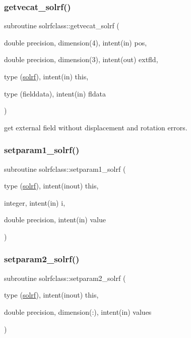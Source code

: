 \subsubsection{\texorpdfstring{getvecat\_solrf()}{getvecat\_solrf()}}
{\footnotesize\ttfamily subroutine solrfclass\+::getvecat\+\_\+solrf (\begin{DoxyParamCaption}\item[{double precision, dimension(4), intent(in)}]{pos,  }\item[{double precision, dimension(3), intent(out)}]{extfld,  }\item[{type (\mbox{\hyperlink{namespacesolrfclass_structsolrfclass_1_1solrf}{solrf}}), intent(in)}]{this,  }\item[{type (fielddata), intent(in)}]{fldata }\end{DoxyParamCaption})}



get external field without displacement and rotation errors. 

\mbox{\label{namespacesolrfclass_ad06b3becdb99ba947f714809bea2af35}} 
\subsubsection{\texorpdfstring{setparam1\_solrf()}{setparam1\_solrf()}}
{\footnotesize\ttfamily subroutine solrfclass\+::setparam1\+\_\+solrf (\begin{DoxyParamCaption}\item[{type (\mbox{\hyperlink{namespacesolrfclass_structsolrfclass_1_1solrf}{solrf}}), intent(inout)}]{this,  }\item[{integer, intent(in)}]{i,  }\item[{double precision, intent(in)}]{value }\end{DoxyParamCaption})}

\mbox{\label{namespacesolrfclass_a4f5cee7483285ca745064b5331f3c30f}} 
\subsubsection{\texorpdfstring{setparam2\_solrf()}{setparam2\_solrf()}}
{\footnotesize\ttfamily subroutine solrfclass\+::setparam2\+\_\+solrf (\begin{DoxyParamCaption}\item[{type (\mbox{\hyperlink{namespacesolrfclass_structsolrfclass_1_1solrf}{solrf}}), intent(inout)}]{this,  }\item[{double precision, dimension(\+:), intent(in)}]{values }\end{DoxyParamCaption})}

